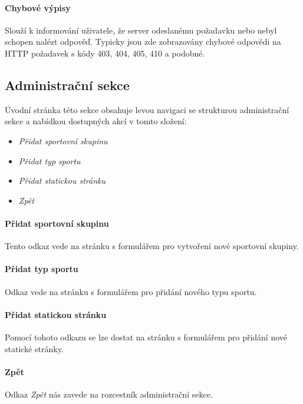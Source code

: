 \documentclass[11pt,oneside]{fithesis}
\begin{document}
            \paragraph*{Chybové výpisy}
            Slouží k informování uživatele, že server odeslanému požadavku  nebo nebyl schopen nalézt odpověď. Typicky jsou zde zobrazovány chybové odpovědi na HTTP požadavek s kódy 403, 404, 405, 410 a podobné.

            \subsection*{Administrační sekce}

            Úvodní stránka této sekce obsahuje levou navigaci se strukturou administrační sekce a nabídkou dostupných akcí v tomto složení:

            \begin{itemize}
                \item \textit{Přidat sportovní skupinu}
                \item \textit{Přidat typ sportu}
                \item \textit{Přidat statickou stránku}
                \item \textit{Zpět}
            \end{itemize}

            \paragraph*{Přidat sportovní skupinu} 
            Tento odkaz vede na stránku s formulářem pro vytvoření nové sportovní skupiny.

            \paragraph*{Přidat typ sportu}
            Odkaz vede na stránku s formulářem pro přidání nového typu sportu.

            \paragraph*{Přidat statickou stránku}
            Pomocí tohoto odkazu se lze dostat na stránku s formulářem pro přidání nové statické stránky.

            \paragraph*{Zpět}
            Odkaz \textit{Zpět} nás zavede na rozcestník administrační sekce.
\end{document}
